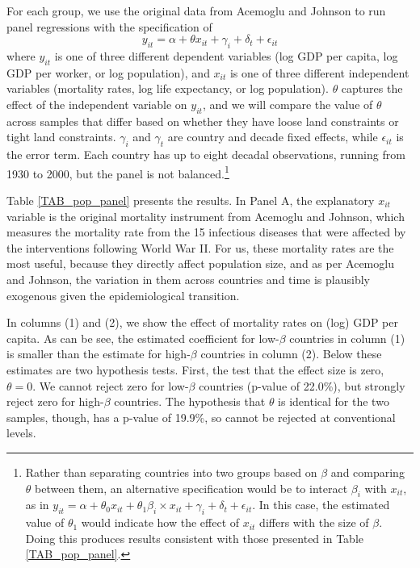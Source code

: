 \documentclass[11pt]{article}
\begin{document}
For each group, we use the original data from Acemoglu and Johnson to run panel regressions with the specification of
\begin{equation}
    y_{it} = \alpha + \theta x_{it} + \gamma_i + \delta_t + \epsilon_{it}
\end{equation}
where $y_{it}$ is one of three different dependent variables (log GDP per capita, log GDP per worker, or log population), and $x_{it}$ is one of three different independent variables (mortality rates, log life expectancy, or log population). $\theta$ captures the effect of the independent variable on $y_{it}$, and we will compare the value of $\theta$ across samples that differ based on whether they have loose land constraints or tight land constraints. $\gamma_i$ and $\gamma_t$ are country and decade fixed effects, while $\epsilon_{it}$ is the error term. Each country has up to eight decadal observations, running from 1930 to 2000, but the panel is not balanced.\footnote{Rather than separating countries into two groups based on $\beta$ and comparing $\theta$ between them, an alternative specification would be to interact $\beta_i$ with $x_{it}$, as in $y_{it} = \alpha + \theta_0 x_{it} + \theta_1 \beta_i \times x_{it} + \gamma_i + \delta_t + \epsilon_{it}$. In this case, the estimated value of $\theta_1$ would indicate how the effect of $x_{it}$ differs with the size of $\beta$. Doing this produces results consistent with those presented in Table \ref{TAB_pop_panel}.}

Table \ref{TAB_pop_panel} presents the results. In Panel A, the explanatory $x_{it}$ variable is the original mortality instrument from Acemoglu and Johnson, which measures the mortality rate from the 15 infectious diseases that were affected by the interventions following World War II. For us, these mortality rates are the most useful, because they directly affect population size, and as per Acemoglu and Johnson, the variation in them across countries and time is plausibly exogenous given the epidemiological transition. 

In columns (1) and (2), we show the effect of mortality rates on (log) GDP per capita. As can be see, the estimated coefficient for low-$\beta$ countries in column (1) is smaller than the estimate for high-$\beta$ countries in column (2). Below these estimates are two hypothesis tests. First, the test that the effect size is zero, $\theta=0$. We cannot reject zero for low-$\beta$ countries (p-value of 22.0\%), but strongly reject zero for high-$\beta$ countries. The hypothesis that $\theta$ is identical for the two samples, though, has a p-value of 19.9\%, so cannot be rejected at conventional levels. 
\end{document}
